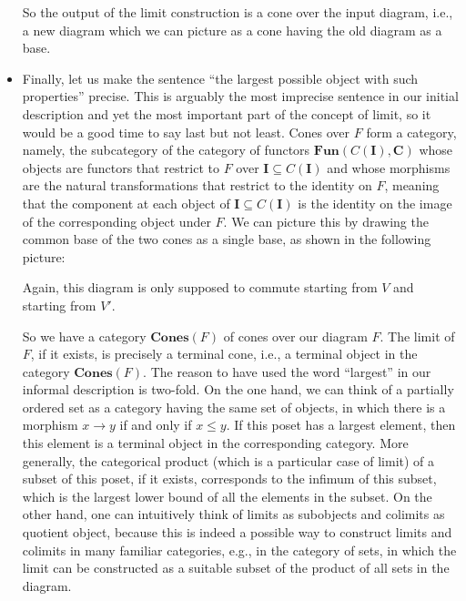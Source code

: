 \documentclass[12pt,reqno,a4paper]{amsart}
\theoremstyle{plain}
\theoremstyle{definition}
\theoremstyle{remark}
\begin{document}
\begin{itemize}
    So the output of the limit construction is a cone over the input diagram, i.e., a new diagram which we can picture as a cone having the old diagram as a base.
  \item Finally, let us make the sentence ``the largest possible object with such properties'' precise.
    This is arguably the most imprecise sentence in our initial description and yet the most important part of the concept of limit, so it would be a good time to say last but not least.
    Cones over $F$ form a category, namely, the subcategory of the category of functors $\mathbf{Fun}(C(\mathbf{I}),\mathbf{C})$ whose objects are functors that restrict to $F$ over $\mathbf{I} \subseteq C(\mathbf{I})$ and whose morphisms are the natural transformations that restrict to the identity on $F$, meaning that the component at each object of $\mathbf{I} \subseteq C(\mathbf{I})$ is the identity on the image of the corresponding object under $F$.
    We can picture this by drawing the common base of the two cones as a single base, as shown in the following picture:
    \begin{center}
    \end{center}
    Again, this diagram is only supposed to commute starting from $V$ and starting from $V'$.
    
    So we have a category $\mathbf{Cones}(F)$ of cones over our diagram $F$.
    The limit of $F$, if it exists, is precisely a terminal cone, i.e., a terminal object in the category $\mathbf{Cones}(F)$.
    The reason to have used the word ``largest'' in our informal description is two-fold.
    On the one hand, we can think of a partially ordered set as a category having the same set of objects, in which there is a morphism $x \to y$ if and only if $x \leq y$.
    If this poset has a largest element, then this element is a terminal object in the corresponding category.
    More generally, the categorical product (which is a particular case of limit) of a subset of this poset, if it exists, corresponds to the infimum of this subset, which is the largest lower bound of all the elements in the subset.
    On the other hand, one can intuitively think of limits as subobjects and colimits as quotient object, because this is indeed a possible way to construct limits and colimits in many familiar categories, e.g., in the category of sets, in which the limit can be constructed as a suitable subset of the product of all sets in the diagram.
\end{itemize}
\end{document}

